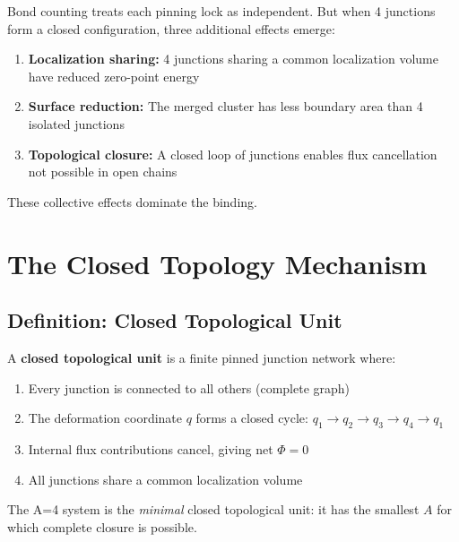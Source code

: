 Bond counting treats each pinning lock as independent. But when 4 junctions
form a closed configuration, three additional effects emerge:

\begin{enumerate}
    \item \textbf{Localization sharing:} 4 junctions sharing a common
          localization volume have reduced zero-point energy
    \item \textbf{Surface reduction:} The merged cluster has less
          boundary area than 4 isolated junctions
    \item \textbf{Topological closure:} A closed loop of junctions
          enables flux cancellation not possible in open chains
\end{enumerate}

These collective effects dominate the binding. \tagP

\section{The Closed Topology Mechanism}
\label{sec:he4:closure}

\subsection{Definition: Closed Topological Unit}

\begin{definition}
    A \textbf{closed topological unit} is a finite pinned junction network
    where:
    \begin{enumerate}
        \item Every junction is connected to all others (complete graph)
        \item The deformation coordinate $q$ forms a closed cycle:
              $q_1 \to q_2 \to q_3 \to q_4 \to q_1$
        \item Internal flux contributions cancel, giving net $\Phi = 0$
        \item All junctions share a common localization volume
    \end{enumerate}
\end{definition}

The A=4 system is the \emph{minimal} closed topological unit:
it has the smallest $A$ for which complete closure is possible. \tagP

